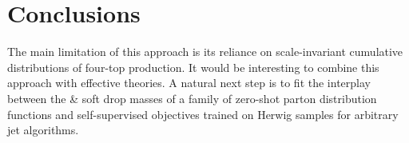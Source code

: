 \section{Conclusions}\label{sec:conclusions}

The main limitation of this approach is its reliance on scale-invariant
cumulative distributions of four-top production. It would be interesting
to combine this approach with effective theories. A natural next step is
to fit the interplay between the & soft drop masses of a family of
zero-shot parton distribution functions and self-supervised objectives
trained on Herwig samples for arbitrary jet algorithms.


